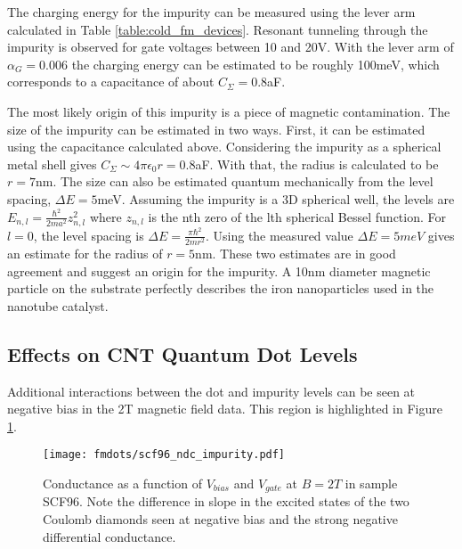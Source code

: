 The charging energy for the impurity can be measured using the lever arm calculated in Table \ref{table:cold_fm_devices}. Resonant tunneling through the impurity is observed for gate voltages between 10 and 20V. With the lever arm of $\alpha_G = 0.006$ the charging energy can be estimated to be roughly 100meV, which corresponds to a capacitance of about $C_{\Sigma} = 0.8$aF. 

The most likely origin of this impurity is a piece of magnetic contamination. The size of the impurity can be estimated in two ways. First, it can be estimated using the capacitance calculated above. Considering the impurity as a spherical metal shell gives $C_{\Sigma} \sim 4\pi \epsilon_0 r = 0.8$aF. With that, the radius is calculated to be $r = 7$nm. The size can also be estimated quantum mechanically from the level spacing, $\Delta E = 5$meV. Assuming the impurity is a 3D spherical well, the levels are $E_{n,l} = \frac{\hbar^2}{2ma^2}z_{n,l}^2$ where $z_{n,l}$ is the nth zero of the lth spherical Bessel function. For $l=0$, the level spacing is $\Delta E = \frac{\pi \hbar^2}{2mr^2}$. Using the measured value $\Delta E = 5meV$ gives an estimate for the radius of $r = 5$nm. These two estimates are in good agreement and suggest an origin for the impurity. A 10nm diameter magnetic particle on the substrate perfectly describes the iron nanoparticles used in the nanotube catalyst.

\subsection{Effects on CNT Quantum Dot Levels}

Additional interactions between the dot and impurity levels can be seen at negative bias in the 2T magnetic field data. This region is highlighted in Figure \ref{fig:scf96_ndc_impurity}.

\begin{figure}
    \centering
    \texttt{[image: fmdots/scf96\_ndc\_impurity.pdf]}
    \caption{Conductance as a function of $V_{bias}$ and $V_{gate}$ at $B=2T$ in sample SCF96. Note the difference in slope in the excited states of the two Coulomb diamonds seen at negative bias and the strong negative differential conductance.}
    \label{fig:scf96_ndc_impurity}
\end{figure}


